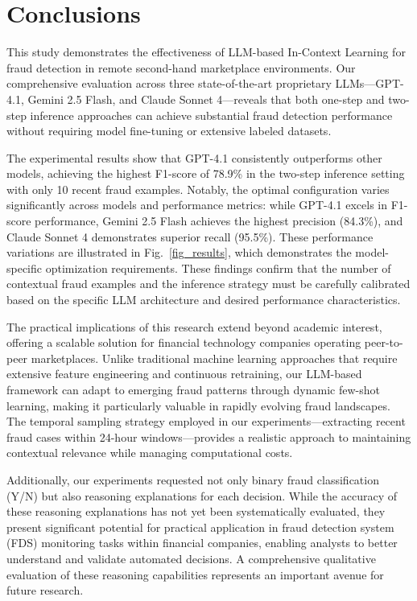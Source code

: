 \documentclass[sigconf]{acmart}
\begin{document}
\section{Conclusions}\label{conclusions}
This study demonstrates the effectiveness of LLM-based In-Context Learning for fraud detection in remote second-hand marketplace environments. Our comprehensive evaluation across three state-of-the-art proprietary LLMs—GPT-4.1, Gemini 2.5 Flash, and Claude Sonnet 4—reveals that both one-step and two-step inference approaches can achieve substantial fraud detection performance without requiring model fine-tuning or extensive labeled datasets. 

The experimental results show that GPT-4.1 consistently outperforms other models, achieving the highest F1-score of 78.9\% in the two-step inference setting with only 10 recent fraud examples. Notably, the optimal configuration varies significantly across models and performance metrics: while GPT-4.1 excels in F1-score performance, Gemini 2.5 Flash achieves the highest precision (84.3\%), and Claude Sonnet 4 demonstrates superior recall (95.5\%). These performance variations are illustrated in Fig.~\ref{fig_results}, which demonstrates the model-specific optimization requirements. These findings confirm that the number of contextual fraud examples and the inference strategy must be carefully calibrated based on the specific LLM architecture and desired performance characteristics.

The practical implications of this research extend beyond academic interest, offering a scalable solution for financial technology companies operating peer-to-peer marketplaces. Unlike traditional machine learning approaches that require extensive feature engineering and continuous retraining, our LLM-based framework can adapt to emerging fraud patterns through dynamic few-shot learning, making it particularly valuable in rapidly evolving fraud landscapes. The temporal sampling strategy employed in our experiments—extracting recent fraud cases within 24-hour windows—provides a realistic approach to maintaining contextual relevance while managing computational costs.

Additionally, our experiments requested not only binary fraud classification (Y/N) but also reasoning explanations for each decision. While the accuracy of these reasoning explanations has not yet been systematically evaluated, they present significant potential for practical application in fraud detection system (FDS) monitoring tasks within financial companies, enabling analysts to better understand and validate automated decisions. A comprehensive qualitative evaluation of these reasoning capabilities represents an important avenue for future research.
\end{document}
